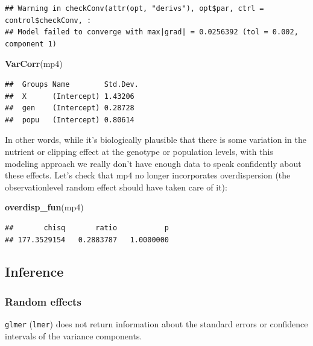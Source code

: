 \documentclass[
  12pt,
]{book}
\newenvironment{Shaded}{\begin{snugshade}}{\end{snugshade}}
\newcommand{\KeywordTok}[1]{\textcolor[rgb]{0.13,0.29,0.53}{\textbf{#1}}}
\newcommand{\NormalTok}[1]{#1}
\begin{document}
\begin{verbatim}
## Warning in checkConv(attr(opt, "derivs"), opt$par, ctrl = control$checkConv, :
## Model failed to converge with max|grad| = 0.0256392 (tol = 0.002, component 1)
\end{verbatim}

\begin{Shaded}
\begin{Highlighting}[]
\KeywordTok{VarCorr}\NormalTok{(mp4)}
\end{Highlighting}
\end{Shaded}

\begin{verbatim}
##  Groups Name        Std.Dev.
##  X      (Intercept) 1.43206 
##  gen    (Intercept) 0.28728 
##  popu   (Intercept) 0.80614
\end{verbatim}

In other words, while it's biologically plausible that there is some variation in the nutrient or clipping effect at the genotype or population levels, with this modeling approach we really don't have enough data to speak confidently about these effects.
Let's check that mp4 no longer incorporates overdispersion (the observationlevel random effect should have taken care of it):

\begin{Shaded}
\begin{Highlighting}[]
\KeywordTok{overdisp_fun}\NormalTok{(mp4)}
\end{Highlighting}
\end{Shaded}

\begin{verbatim}
##       chisq       ratio           p 
## 177.3529154   0.2883787   1.0000000
\end{verbatim}

\hypertarget{inference}{%
\subsection{Inference}\label{inference}}

\hypertarget{random-effects}{%
\subsubsection{Random effects}\label{random-effects}}

\texttt{glmer} (\texttt{lmer}) does not return information about the standard errors or confidence intervals of the variance components.
\end{document}
